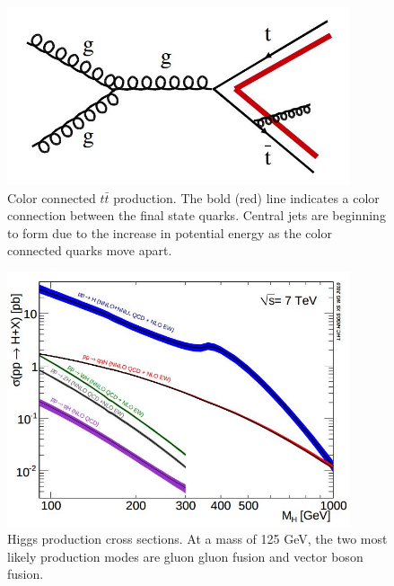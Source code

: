 \documentclass[oneside, letterpaper, oldfontcommands]{memoir}
\begin{document}
\begin{figure}[here]
\includegraphics[width=0.9\textwidth]{ttbarcolor.jpg}
\caption{Color connected $t\bar{t}$ production. The bold (red) line indicates a color connection between the final state quarks. Central jets are beginning to form due to the increase in potential energy as the color connected quarks move apart.}
\label{fig:ttbarcolor}
\end{figure}

\begin{figure}[here]
\includegraphics[width=0.9\textwidth]{higgsproduction.jpg}
\caption{Higgs production cross sections\cite{Dittmaier:2011ti}. At a mass of 125 GeV, the two most likely production modes are gluon gluon fusion and vector boson fusion.}
\label{fig:higgsproduction}
\end{figure}
\end{document}
